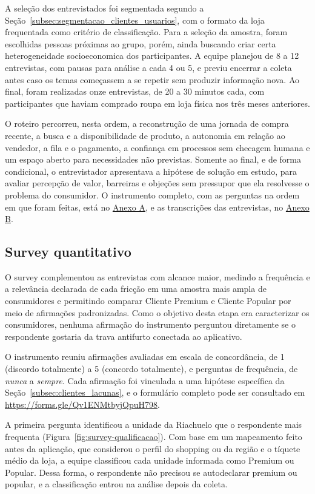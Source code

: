 A seleção dos entrevistados foi segmentada segundo a Seção~\ref{subsec:segmentacao_clientes_usuarios}, com o formato da loja frequentada como critério de classificação. Para a seleção da amostra, foram escolhidas pessoas próximas ao grupo, porém, ainda buscando criar certa heterogeneidade socioeconomica dos participantes. A equipe planejou de 8 a 12 entrevistas, com pausas para análise a cada 4 ou 5, e previu encerrar a coleta antes caso os temas começassem a se repetir sem produzir informação nova. Ao final, foram realizadas onze entrevistas, de 20 a 30 minutos cada, com participantes que haviam comprado roupa em loja física nos três meses anteriores.

O roteiro percorreu, nesta ordem, a reconstrução de uma jornada de compra recente, a busca e a disponibilidade de produto, a autonomia em relação ao vendedor, a fila e o pagamento, a confiança em processos sem checagem humana e um espaço aberto para necessidades não previstas. Somente ao final, e de forma condicional, o entrevistador apresentava a hipótese de solução em estudo, para avaliar percepção de valor, barreiras e objeções sem pressupor que ela resolvesse o problema do consumidor. O instrumento completo, com as perguntas na ordem em que foram feitas, está no \hyperref[anexo:roteiro_entrevistas]{Anexo A}, e as transcrições das entrevistas, no \hyperref[anexo:entrevistas]{Anexo B}.

\subsection{Survey quantitativo}
\label{subsec:survey}

O survey complementou as entrevistas com alcance maior, medindo a frequência e a relevância declarada de cada fricção em uma amostra mais ampla de consumidores e permitindo comparar Cliente Premium e Cliente Popular por meio de afirmações padronizadas. Como o objetivo desta etapa era caracterizar os consumidores, nenhuma afirmação do instrumento perguntou diretamente se o respondente gostaria da trava antifurto conectada ao aplicativo.

O instrumento reuniu afirmações avaliadas em escala de concordância, de 1 (discordo totalmente) a 5 (concordo totalmente), e perguntas de frequência, de \emph{nunca} a \emph{sempre}. Cada afirmação foi vinculada a uma hipótese específica da Seção~\ref{subsec:clientes_lacunas}, e o formulário completo pode ser consultado em \url{https://forms.gle/Qv1ENMtbyjQpuH798}.

A primeira pergunta identificou a unidade da Riachuelo que o respondente mais frequenta (Figura~\ref{fig:survey-qualificacao}). Com base em um mapeamento feito antes da aplicação, que considerou o perfil do shopping ou da região e o tíquete médio da loja, a equipe classificou cada unidade informada como Premium ou Popular. Dessa forma, o respondente não precisou se autodeclarar premium ou popular, e a classificação entrou na análise depois da coleta.

